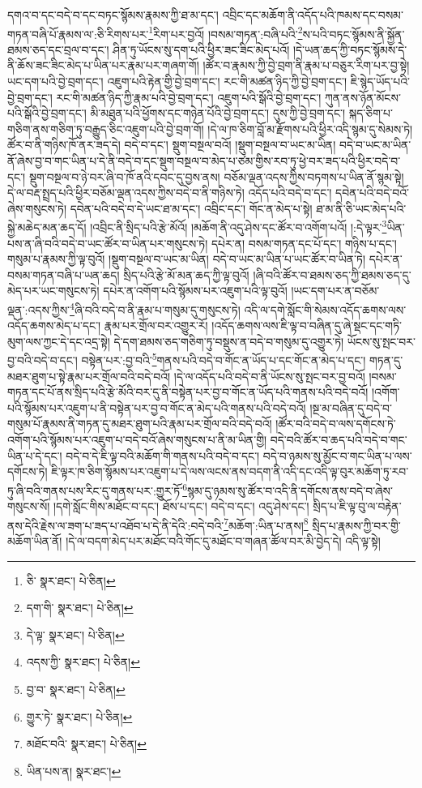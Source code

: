 དགའ་བ་དང་བདེ་བ་དང་བཏང་སྙོམས་རྣམས་ཀྱི་ཐ་མ་དང་། འབྲིང་དང་མཆོག་ནི་འདོད་པའི་ཁམས་དང་བསམ་གཏན་བཞི་པོ་རྣམས་ལ་:ཅི་རིགས་པར་\footnote{ཅི་  སྣར་ཐང་།  པེ་ཅིན། }རིག་པར་བྱའོ། །བསམ་གཏན་:བཞི་པའི་\footnote{དག་གི་  སྣར་ཐང་།  པེ་ཅིན། }ས་པའི་བཏང་སྙོམས་ནི་སྐྱོན་ཐམས་ཅད་དང་བྲལ་བ་དང་། ཤིན་ཏུ་ཡོངས་སུ་དག་པའི་ཕྱིར་ཟང་ཟིང་མེད་པའོ། །དེ་ཡན་ཆད་ཀྱི་བཏང་སྙོམས་དེ་ནི་ཆོས་ཟང་ཟིང་མེད་པ་ཡིན་པར་རྣམ་པར་གཞག་གོ། །ཚོར་བ་རྣམས་ཀྱི་བྱེ་བྲག་ནི་རྣམ་པ་བཅུར་རིག་པར་བྱ་སྟེ། ཡང་དག་པའི་བྱེ་བྲག་དང་། འཇུག་པའི་རྟེན་གྱི་བྱེ་བྲག་དང་། རང་གི་མཚན་ཉིད་ཀྱི་བྱེ་བྲག་དང་། ཇི་སྙེད་ཡོད་པའི་བྱེ་བྲག་དང་། རང་གི་མཚན་ཉིད་ཀྱི་རྣམ་པའི་བྱེ་བྲག་དང་། འཇུག་པའི་སྒོའི་བྱེ་བྲག་དང་། ཀུན་ནས་ཉོན་མོངས་པའི་སྒོའི་བྱེ་བྲག་དང་། མི་མཐུན་པའི་ཕྱོགས་དང་གཉེན་པོའི་བྱེ་བྲག་དང་། དུས་ཀྱི་བྱེ་བྲག་དང་། སྐད་ཅིག་པ་གཅིག་ནས་གཅིག་ཏུ་བརྒྱུད་ཅིང་འཇུག་པའི་བྱེ་བྲག་གོ། །དེ་ལ་ཁ་ཅིག་བློ་མ་རྫོགས་པའི་ཕྱིར་འདི་སྙམ་དུ་སེམས་ཏེ། ཚོར་བ་ནི་གཉིས་ཁོ་ནར་ཟད་དེ། བདེ་བ་དང་། སྡུག་བསྔལ་བའོ། །སྡུག་བསྔལ་བ་ཡང་མ་ཡིན། བདེ་བ་ཡང་མ་ཡིན་ནོ་ཞེས་བྱ་བ་གང་ཡིན་པ་དེ་ནི་བདེ་བ་དང་སྡུག་བསྔལ་བ་མེད་པ་ཙམ་གྱིས་རབ་ཏུ་ཕྱེ་བར་ཟད་པའི་ཕྱིར་བདེ་བ་དང་། སྡུག་བསྔལ་བ་ཉེ་བར་ཞི་བ་ཁོ་ནའི་དབང་དུ་བྱས་ནས། བཅོམ་ལྡན་འདས་ཀྱིས་བཏགས་པ་ཡིན་ནོ་སྙམ་སྟེ། དེ་ལ་བརྡ་སྤྲད་པའི་ཕྱིར་བཅོམ་ལྡན་འདས་ཀྱིས་བདེ་བ་ནི་གཉིས་ཏེ། འདོད་པའི་བདེ་བ་དང་། དབེན་པའི་བདེ་བའོ་ཞེས་གསུངས་ཏེ། དབེན་པའི་བདེ་བ་དེ་ཡང་ཐ་མ་དང་། འབྲིང་དང་། གོང་ན་མེད་པ་སྟེ། ཐ་མ་ནི་ཅི་ཡང་མེད་པའི་སྐྱེ་མཆེད་མན་ཆད་དོ། །འབྲིང་ནི་སྲིད་པའི་རྩེ་མོའོ། །མཆོག་ནི་འདུ་ཤེས་དང་ཚོར་བ་འགོག་པའོ། །:དེ་ལྟར་\footnote{དེ་ལྟ་  སྣར་ཐང་།  པེ་ཅིན། }ཡིན་པས་ན་ཞི་བའི་བདེ་བ་ཡང་ཚོར་བ་ཡིན་པར་གསུངས་ཏེ། དཔེར་ན། བསམ་གཏན་དང་པོ་དང་། གཉིས་པ་དང་། གསུམ་པ་རྣམས་ཀྱི་ལྟ་བུའོ། །སྡུག་བསྔལ་བ་ཡང་མ་ཡིན། བདེ་བ་ཡང་མ་ཡིན་པ་ཡང་ཚོར་བ་ཡིན་ཏེ། དཔེར་ན་བསམ་གཏན་བཞི་པ་ཡན་ཆད། སྲིད་པའི་རྩེ་མོ་མན་ཆད་ཀྱི་ལྟ་བུའོ། །ཞི་བའི་ཚོར་བ་ཐམས་ཅད་ཀྱི་ཐམས་ཅད་དུ་མེད་པར་ཡང་གསུངས་ཏེ། དཔེར་ན་འགོག་པའི་སྙོམས་པར་འཇུག་པའི་ལྟ་བུའོ། །ཡང་དག་པར་ན་བཅོམ་ལྡན་:འདས་ཀྱིས་\footnote{འདས་ཀྱི་  སྣར་ཐང་།  པེ་ཅིན། }ཞི་བའི་བདེ་བ་ནི་རྣམ་པ་གསུམ་དུ་གསུངས་ཏེ། འདི་ལ་དགེ་སློང་གི་སེམས་འདོད་ཆགས་ལས་འདོད་ཆགས་མེད་པ་དང་། རྣམ་པར་གྲོལ་བར་འགྱུར་རོ། །འདོད་ཆགས་ལས་ཇི་ལྟ་བ་བཞིན་དུ་ཞེ་སྡང་དང་གཏི་མུག་ལས་ཀྱང་དེ་དང་འདྲ་སྟེ། དེ་དག་ཐམས་ཅད་གཅིག་ཏུ་བསྡུས་ན་བདེ་བ་གསུམ་དུ་འགྱུར་ཏེ། ཡོངས་སུ་སྤང་བར་བྱ་བའི་བདེ་བ་དང་། བསྟེན་པར་:བྱ་བའི་\footnote{བྱ་བ་  སྣར་ཐང་།  པེ་ཅིན། }གནས་པའི་བདེ་བ་གོང་ན་ཡོད་པ་དང་གོང་ན་མེད་པ་དང་། གཏན་དུ་མཐར་ཐུག་པ་སྟེ་རྣམ་པར་གྲོལ་བའི་བདེ་བའོ། །དེ་ལ་འདོད་པའི་བདེ་བ་ནི་ཡོངས་སུ་སྤང་བར་བྱ་བའོ། །བསམ་གཏན་དང་པོ་ནས་སྲིད་པའི་རྩེ་མོའི་བར་དུ་ནི་བསྟེན་པར་བྱ་བ་གོང་ན་ཡོད་པའི་གནས་པའི་བདེ་བའོ། །འགོག་པའི་སྙོམས་པར་འཇུག་པ་ནི་བསྟེན་པར་བྱ་བ་གོང་ན་མེད་པའི་གནས་པའི་བདེ་བའོ། །སྔ་མ་བཞིན་དུ་བདེ་བ་གསུམ་པོ་རྣམས་ནི་གཏན་དུ་མཐར་ཐུག་པའི་རྣམ་པར་གྲོལ་བའི་བདེ་བའོ། །ཚོར་བའི་བདེ་བ་ལས་དགོངས་ཏེ་འགོག་པའི་སྙོམས་པར་འཇུག་པ་བདེ་བའོ་ཞེས་གསུངས་པ་ནི་མ་ཡིན་གྱི། བདེ་བའི་ཚོར་བ་ཆད་པའི་བདེ་བ་གང་ཡིན་པ་དེ་དང་། བདེ་བ་དེ་ཇི་ལྟ་བའི་མཆོག་གི་གནས་པའི་བདེ་བ་དང་། བདེ་བ་ཉམས་སུ་མྱོང་བ་གང་ཡིན་པ་ལས་དགོངས་ཏེ། ཇི་ལྟར་ཁ་ཅིག་སྙོམས་པར་འཇུག་པ་དེ་ལས་ལངས་ནས་བདག་ནི་འདི་དང་འདི་ལྟ་བུར་མཆོག་ཏུ་རབ་ཏུ་ཞི་བའི་གནས་པས་རིང་དུ་གནས་པར་:གྱུར་ཏོ་\footnote{གྱུར་ཏེ་  སྣར་ཐང་།  པེ་ཅིན། }སྙམ་དུ་ཉམས་སུ་ཚོར་བ་འདི་ནི་དགོངས་ནས་བདེ་བ་ཞེས་གསུངས་སོ། །དགེ་སློང་གིས་མཐོང་བ་དང་། ཐོས་པ་དང་། བདེ་བ་དང་། འདུ་ཤེས་དང་། སྲིད་པ་ཇི་ལྟ་བུ་ལ་བརྟེན་ནས་དེའི་རྗེས་ལ་ཟག་པ་ཟད་པ་འཐོབ་པ་དེ་ནི་དེའི་:བདེ་བའི་\footnote{མཐོང་བའི་  སྣར་ཐང་།  པེ་ཅིན། }མཆོག་:ཡིན་པ་ནས།\footnote{ཡིན་པས་ན།  སྣར་ཐང་། } སྲིད་པ་རྣམས་ཀྱི་བར་གྱི་མཆོག་ཡིན་ནོ། །དེ་ལ་བདག་མེད་པར་མཐོང་བའི་གོང་དུ་མཐོང་བ་གཞན་ཚོལ་བར་མི་བྱེད་དེ། འདི་ལྟ་སྟེ། 